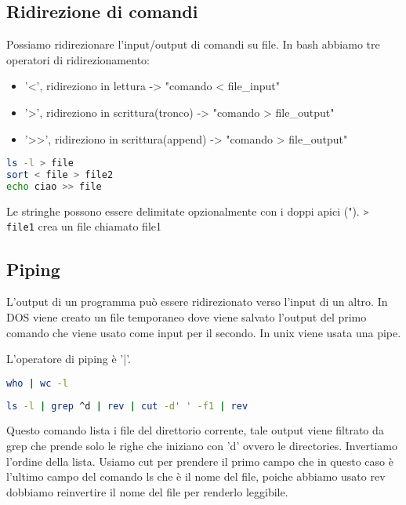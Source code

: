 \documentclass
[10pt,        %
 a4paper,     %
 onecolumn,   %
 fleqn,       %
 oneside,     %
 notitlepage, %
 openany      %
]{article}    %
\begin{document}
\subsection{Ridirezione di comandi}
Possiamo ridirezionare l'input/output di comandi su file. In bash abbiamo tre operatori di ridirezionamento:
\begin{itemize}
    \item '<', ridireziono in lettura -> "comando < file\_input"
    \item '>', ridireziono in scrittura(tronco) -> "comando > file\_output"
    \item '>>', ridireziono in scrittura(append) -> "comando > file\_output"
\end{itemize}

\begin{lstlisting}[language=bash]
ls -l > file
sort < file > file2
echo ciao >> file
\end{lstlisting}

Le stringhe possono essere delimitate opzionalmente con i doppi apici (").
\lstinline[language=bash]!> file1! crea un file chiamato file1

\subsection{Piping}
L'output di un programma può essere ridirezionato verso l'input di un altro. In DOS viene creato un file temporaneo dove viene salvato l'output del primo comando che viene usato come input per il secondo. In unix viene usata una pipe.

L'operatore di piping è '|'.

\begin{lstlisting}[language=bash, name=Conta gli utenti collegati]
who | wc -l
\end{lstlisting}
\begin{lstlisting}[language=bash, name=Un esempio di piping complesso]
ls -l | grep ^d | rev | cut -d' ' -f1 | rev
\end{lstlisting}
Questo comando lista i file del direttorio corrente, tale output viene filtrato da grep che prende solo le righe che iniziano con 'd' ovvero le directories. Invertiamo l'ordine della lista. Usiamo cut per prendere il primo campo che in questo caso è l'ultimo campo del comando ls che è il nome del file, poiche abbiamo usato rev dobbiamo reinvertire il nome del file per renderlo leggibile.
\end{document}
